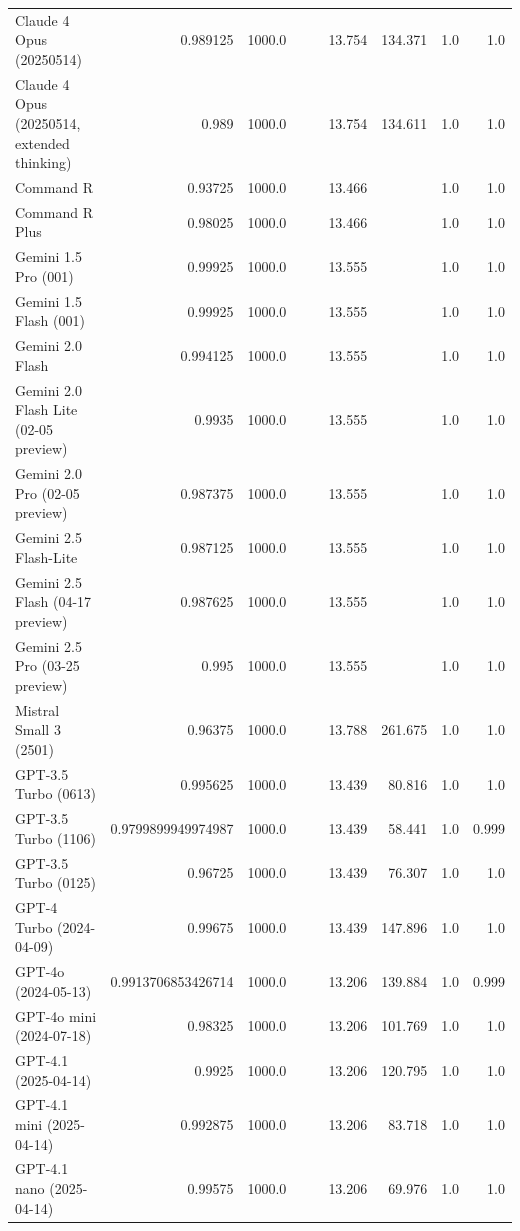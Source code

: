 \begin{table}[htp]
{\begin{tabular}{lrrrrrrrr}
Claude 4 Opus (20250514) & 0.989125 & 1000.0 &  &  & 13.754 & 134.371 & 1.0 & 1.0 \\
Claude 4 Opus (20250514, extended thinking) & 0.989 & 1000.0 &  &  & 13.754 & 134.611 & 1.0 & 1.0 \\
Command R & 0.93725 & 1000.0 &  &  & 13.466 &  & 1.0 & 1.0 \\
Command R Plus & 0.98025 & 1000.0 &  &  & 13.466 &  & 1.0 & 1.0 \\
Gemini 1.5 Pro (001) & 0.99925 & 1000.0 &  &  & 13.555 &  & 1.0 & 1.0 \\
Gemini 1.5 Flash (001) & 0.99925 & 1000.0 &  &  & 13.555 &  & 1.0 & 1.0 \\
Gemini 2.0 Flash & 0.994125 & 1000.0 &  &  & 13.555 &  & 1.0 & 1.0 \\
Gemini 2.0 Flash Lite (02-05 preview) & 0.9935 & 1000.0 &  &  & 13.555 &  & 1.0 & 1.0 \\
Gemini 2.0 Pro (02-05 preview) & 0.987375 & 1000.0 &  &  & 13.555 &  & 1.0 & 1.0 \\
Gemini 2.5 Flash-Lite & 0.987125 & 1000.0 &  &  & 13.555 &  & 1.0 & 1.0 \\
Gemini 2.5 Flash (04-17 preview) & 0.987625 & 1000.0 &  &  & 13.555 &  & 1.0 & 1.0 \\
Gemini 2.5 Pro (03-25 preview) & 0.995 & 1000.0 &  &  & 13.555 &  & 1.0 & 1.0 \\
Mistral Small 3 (2501) & 0.96375 & 1000.0 &  &  & 13.788 & 261.675 & 1.0 & 1.0 \\
GPT-3.5 Turbo (0613) & 0.995625 & 1000.0 &  &  & 13.439 & 80.816 & 1.0 & 1.0 \\
GPT-3.5 Turbo (1106) & 0.9799899949974987 & 1000.0 &  &  & 13.439 & 58.441 & 1.0 & 0.999 \\
GPT-3.5 Turbo (0125) & 0.96725 & 1000.0 &  &  & 13.439 & 76.307 & 1.0 & 1.0 \\
GPT-4 Turbo (2024-04-09) & 0.99675 & 1000.0 &  &  & 13.439 & 147.896 & 1.0 & 1.0 \\
GPT-4o (2024-05-13) & 0.9913706853426714 & 1000.0 &  &  & 13.206 & 139.884 & 1.0 & 0.999 \\
GPT-4o mini (2024-07-18) & 0.98325 & 1000.0 &  &  & 13.206 & 101.769 & 1.0 & 1.0 \\
GPT-4.1 (2025-04-14) & 0.9925 & 1000.0 &  &  & 13.206 & 120.795 & 1.0 & 1.0 \\
GPT-4.1 mini (2025-04-14) & 0.992875 & 1000.0 &  &  & 13.206 & 83.718 & 1.0 & 1.0 \\
GPT-4.1 nano (2025-04-14) & 0.99575 & 1000.0 &  &  & 13.206 & 69.976 & 1.0 & 1.0 \\

\end{tabular}}
\end{table}
